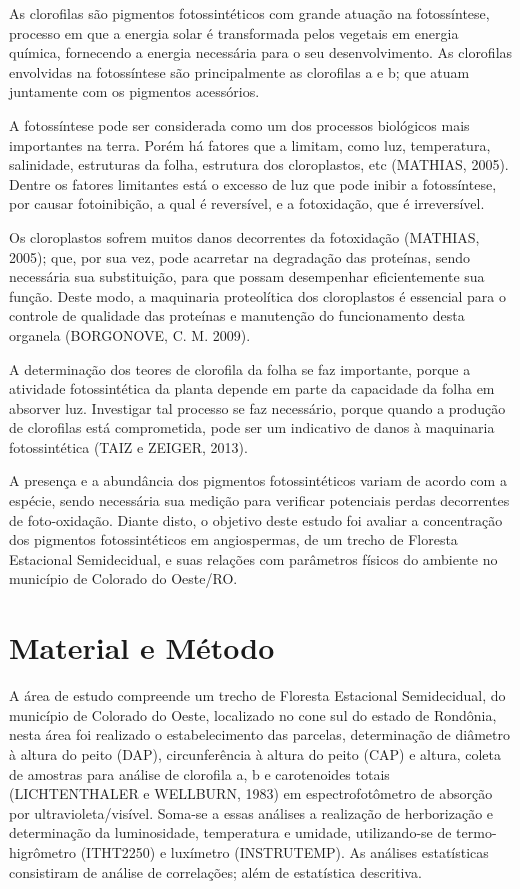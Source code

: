 \documentclass[article,12pt,onesidea,4paper,english,brazil]{abntex2}
\begin{document}
	As clorofilas são pigmentos fotossintéticos com grande atuação na fotossíntese, processo em que a energia solar é transformada pelos vegetais em energia química, fornecendo a energia necessária para o seu desenvolvimento. As clorofilas envolvidas na fotossíntese são principalmente as clorofilas a e b; que atuam juntamente com os pigmentos acessórios.
	
	A fotossíntese pode ser considerada como um dos processos biológicos mais importantes na terra. Porém há fatores que a limitam, como luz, temperatura, salinidade, estruturas da folha, estrutura dos cloroplastos, etc (MATHIAS, 2005). Dentre os fatores limitantes está o excesso de luz que pode inibir a fotossíntese, por causar fotoinibição, a qual é reversível, e a fotoxidação, que é irreversível.
	
	Os cloroplastos sofrem muitos danos decorrentes da fotoxidação (MATHIAS, 2005); que, por sua vez, pode acarretar na degradação das proteínas, sendo necessária sua substituição, para que possam desempenhar eficientemente sua função. Deste modo, a maquinaria proteolítica dos cloroplastos é essencial para o controle de qualidade das proteínas e manutenção do funcionamento desta organela (BORGONOVE, C. M. 2009).
	
	A determinação dos teores de clorofila da folha se faz importante, porque a atividade fotossintética da planta depende em parte da capacidade da folha em absorver luz. Investigar tal processo se faz necessário, porque quando a produção de clorofilas está comprometida, pode ser um indicativo de danos à maquinaria fotossintética (TAIZ e ZEIGER, 2013).
	
	A presença e a abundância dos pigmentos fotossintéticos variam de acordo com a espécie, sendo necessária sua medição para verificar potenciais perdas decorrentes de foto-oxidação. Diante disto, o objetivo deste estudo foi avaliar a concentração dos pigmentos fotossintéticos em angiospermas, de um trecho de Floresta Estacional Semidecidual, e suas relações com parâmetros físicos do ambiente no município de Colorado do Oeste/RO.
	
	\section*{Material e Método}
	
	A área de estudo compreende um trecho de Floresta Estacional Semidecidual, do município de Colorado do Oeste, localizado no cone sul do estado de Rondônia, nesta área foi realizado o estabelecimento das parcelas, determinação de diâmetro à altura do peito (DAP), circunferência à altura do peito (CAP) e altura, coleta de amostras para análise de clorofila a, b e carotenoides totais (LICHTENTHALER e WELLBURN, 1983) em espectrofotômetro de absorção por ultravioleta/visível. Soma-se a essas análises a realização de herborização e determinação da luminosidade, temperatura e umidade, utilizando-se de termo- higrômetro (ITHT2250) e luxímetro (INSTRUTEMP). As análises estatísticas consistiram de análise de correlações; além de estatística descritiva.
	
\end{document}
